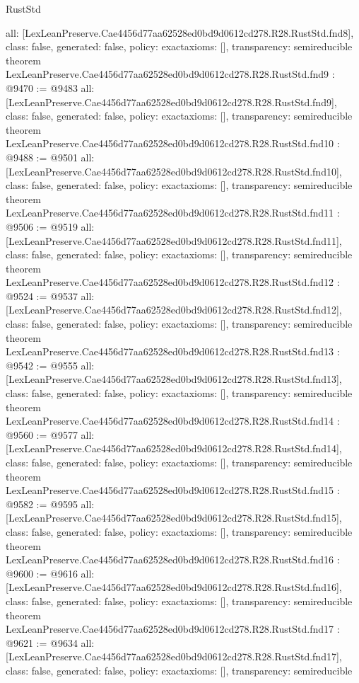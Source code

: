\begin{lexlean}{RustStd}
\begin{coremodule}
{  all: [LexLeanPreserve.Cae4456d77aa62528ed0bd9d0612cd278.R28.RustStd.fnd8],
  class: false,
  generated: false,
  policy: exact{axioms: []},
  transparency: semireducible
}
theorem LexLeanPreserve.Cae4456d77aa62528ed0bd9d0612cd278.R28.RustStd.fnd9 : @9470 := @9483 {
  all: [LexLeanPreserve.Cae4456d77aa62528ed0bd9d0612cd278.R28.RustStd.fnd9],
  class: false,
  generated: false,
  policy: exact{axioms: []},
  transparency: semireducible
}
theorem LexLeanPreserve.Cae4456d77aa62528ed0bd9d0612cd278.R28.RustStd.fnd10 : @9488 := @9501 {
  all: [LexLeanPreserve.Cae4456d77aa62528ed0bd9d0612cd278.R28.RustStd.fnd10],
  class: false,
  generated: false,
  policy: exact{axioms: []},
  transparency: semireducible
}
theorem LexLeanPreserve.Cae4456d77aa62528ed0bd9d0612cd278.R28.RustStd.fnd11 : @9506 := @9519 {
  all: [LexLeanPreserve.Cae4456d77aa62528ed0bd9d0612cd278.R28.RustStd.fnd11],
  class: false,
  generated: false,
  policy: exact{axioms: []},
  transparency: semireducible
}
theorem LexLeanPreserve.Cae4456d77aa62528ed0bd9d0612cd278.R28.RustStd.fnd12 : @9524 := @9537 {
  all: [LexLeanPreserve.Cae4456d77aa62528ed0bd9d0612cd278.R28.RustStd.fnd12],
  class: false,
  generated: false,
  policy: exact{axioms: []},
  transparency: semireducible
}
theorem LexLeanPreserve.Cae4456d77aa62528ed0bd9d0612cd278.R28.RustStd.fnd13 : @9542 := @9555 {
  all: [LexLeanPreserve.Cae4456d77aa62528ed0bd9d0612cd278.R28.RustStd.fnd13],
  class: false,
  generated: false,
  policy: exact{axioms: []},
  transparency: semireducible
}
theorem LexLeanPreserve.Cae4456d77aa62528ed0bd9d0612cd278.R28.RustStd.fnd14 : @9560 := @9577 {
  all: [LexLeanPreserve.Cae4456d77aa62528ed0bd9d0612cd278.R28.RustStd.fnd14],
  class: false,
  generated: false,
  policy: exact{axioms: []},
  transparency: semireducible
}
theorem LexLeanPreserve.Cae4456d77aa62528ed0bd9d0612cd278.R28.RustStd.fnd15 : @9582 := @9595 {
  all: [LexLeanPreserve.Cae4456d77aa62528ed0bd9d0612cd278.R28.RustStd.fnd15],
  class: false,
  generated: false,
  policy: exact{axioms: []},
  transparency: semireducible
}
theorem LexLeanPreserve.Cae4456d77aa62528ed0bd9d0612cd278.R28.RustStd.fnd16 : @9600 := @9616 {
  all: [LexLeanPreserve.Cae4456d77aa62528ed0bd9d0612cd278.R28.RustStd.fnd16],
  class: false,
  generated: false,
  policy: exact{axioms: []},
  transparency: semireducible
}
theorem LexLeanPreserve.Cae4456d77aa62528ed0bd9d0612cd278.R28.RustStd.fnd17 : @9621 := @9634 {
  all: [LexLeanPreserve.Cae4456d77aa62528ed0bd9d0612cd278.R28.RustStd.fnd17],
  class: false,
  generated: false,
  policy: exact{axioms: []},
  transparency: semireducible
}
\end{coremodule}
\end{lexlean}
